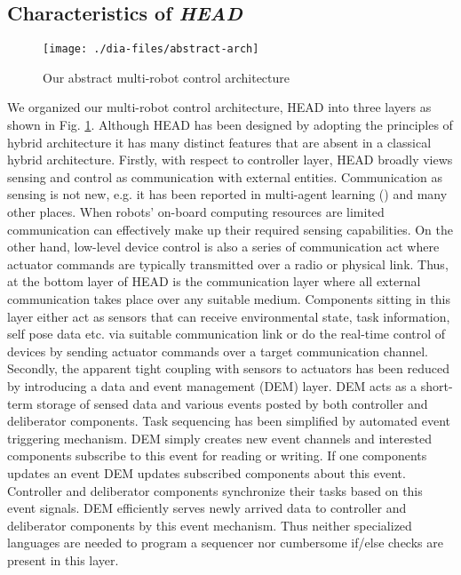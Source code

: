 \subsection*{Characteristics of {\em HEAD}}
\begin{figure}
\begin{center}
\texttt{[image: ./dia-files/abstract-arch]} %
\caption{Our abstract multi-robot control architecture} 
\label{fig:abstract-arch}
\end{center}
\end{figure}
We organized our  multi-robot control architecture, HEAD into three layers as shown in Fig. \ref{fig:abstract-arch}. Although HEAD has been designed by adopting the principles of hybrid architecture it has many distinct features that are absent in a classical hybrid architecture. Firstly, with respect to controller layer, HEAD broadly views sensing and control as communication with external entities. Communication as sensing is not new, e.g. it has been reported in multi-agent learning (\cite{Mataric1998}) and many other places. When robots' on-board computing resources are limited communication can effectively make up their required sensing capabilities. On the other hand, low-level device control is also a series of communication act where actuator commands are typically transmitted over a radio or physical link. Thus, at the bottom layer of HEAD is the communication layer where all external communication takes place over any suitable medium. Components sitting in this layer either act as sensors that can receive environmental state, task information, self pose data etc. via suitable communication link or do the real-time control of devices by sending actuator commands over a target communication channel. \\
Secondly, the apparent tight coupling with sensors to actuators has been reduced by introducing a data and event management (DEM) layer. DEM acts as a short-term storage of sensed data and various events posted by both controller and deliberator components. Task sequencing has been simplified by automated event triggering mechanism. DEM simply creates new event channels and interested components subscribe to this event for reading or writing. If one components updates an event DEM updates subscribed components about this event. Controller and deliberator components synchronize their tasks based on this event signals. DEM efficiently serves newly arrived data to controller and deliberator components by this event mechanism. Thus neither specialized languages are needed to program a sequencer nor cumbersome if/else checks are present in this layer.\\
